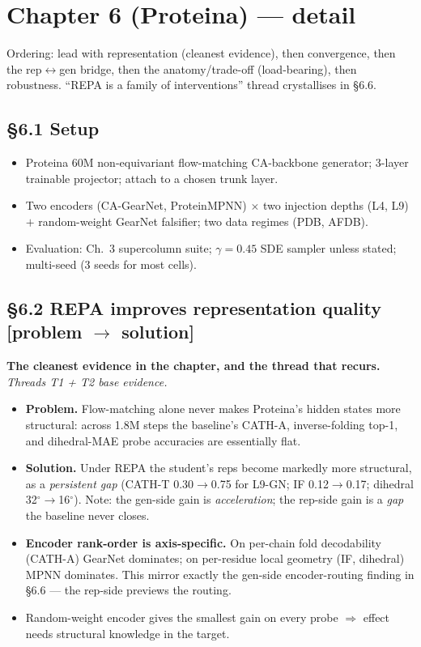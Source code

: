 \documentclass[11pt,a4paper]{article}
\begin{document}
\section{Chapter 6 (Proteina) --- detail}

Ordering: lead with representation (cleanest evidence), then convergence,
then the rep$\leftrightarrow$gen bridge, then the anatomy/trade-off
(load-bearing), then robustness. ``REPA is a family of interventions''
thread crystallises in \S6.6.

\subsection*{\S6.1 Setup}
\begin{itemize}[leftmargin=*,itemsep=0pt]
\item Proteina 60M non-equivariant flow-matching CA-backbone generator;
3-layer trainable projector; attach to a chosen trunk layer.
\item Two encoders (CA-GearNet, ProteinMPNN) $\times$ two injection depths
(L4, L9) $+$ random-weight GearNet falsifier; two data regimes (PDB,
AFDB).
\item Evaluation: Ch.~3 supercolumn suite; $\gamma=0.45$ SDE sampler
unless stated; multi-seed (3 seeds for most cells).
\end{itemize}

\subsection*{\S6.2 REPA improves representation quality [problem $\to$ solution]}

\textbf{The cleanest evidence in the chapter, and the thread that
recurs.} \emph{Threads T1 + T2 base evidence.}

\begin{itemize}[leftmargin=*,itemsep=0pt]
\item \textbf{Problem.} Flow-matching alone never makes Proteina's hidden
states more structural: across 1.8M steps the baseline's CATH-A,
inverse-folding top-1, and dihedral-MAE probe accuracies are essentially
flat.
\item \textbf{Solution.} Under REPA the student's reps become markedly
more structural, as a \emph{persistent gap} (CATH-T 0.30$\to$0.75 for
L9-GN; IF 0.12$\to$0.17; dihedral 32$^\circ$$\to$16$^\circ$). Note: the
gen-side gain is \emph{acceleration}; the rep-side gain is a \emph{gap}
the baseline never closes.
\item \textbf{Encoder rank-order is axis-specific.} On per-chain fold
decodability (CATH-A) GearNet dominates; on per-residue local geometry
(IF, dihedral) MPNN dominates. This mirror exactly the gen-side
encoder-routing finding in \S6.6 --- the rep-side previews the routing.
\item Random-weight encoder gives the smallest gain on every probe
$\Rightarrow$ effect needs structural knowledge in the target.
\end{itemize}
\end{document}
